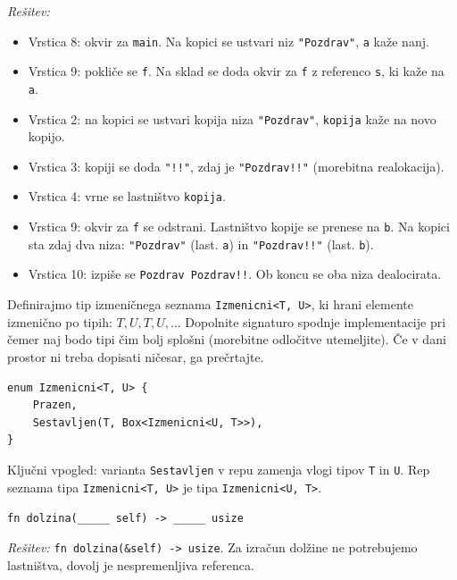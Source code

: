 \documentclass[arhiv]{../izpit}
\begin{document}
\noindent
\emph{Rešitev:}
\begin{itemize}
  \item Vrstica 8: okvir za \texttt{main}. Na kopici se ustvari niz \texttt{"Pozdrav"}, \texttt{a} kaže nanj.
  \item Vrstica 9: pokliče se \texttt{f}. Na sklad se doda okvir za \texttt{f} z referenco \texttt{s}, ki kaže na \texttt{a}.
  \item Vrstica 2: na kopici se ustvari kopija niza \texttt{"Pozdrav"}, \texttt{kopija} kaže na novo kopijo.
  \item Vrstica 3: kopiji se doda \texttt{"!!"}, zdaj je \texttt{"Pozdrav!!"} (morebitna realokacija).
  \item Vrstica 4: vrne se lastništvo \texttt{kopija}.
  \item Vrstica 9: okvir za \texttt{f} se odstrani. Lastništvo kopije se prenese na \texttt{b}. Na kopici sta zdaj dva niza: \texttt{"Pozdrav"} (last. \texttt{a}) in \texttt{"Pozdrav!!"} (last. \texttt{b}).
  \item Vrstica 10: izpiše se \texttt{Pozdrav Pozdrav!!}. Ob koncu se oba niza dealocirata.
\end{itemize}



\naloga[\tocke{20}]

Definirajmo tip izmeničnega seznama \texttt{Izmenicni<T, U>}, ki hrani elemente izmenično po tipih: $T, U, T, U, \ldots$ Dopolnite signaturo spodnje implementacije pri čemer naj bodo tipi čim bolj splošni (morebitne odločitve utemeljite). Če v dani prostor ni treba dopisati ničesar, ga prečrtajte.

{\large
\begin{verbatim}
enum Izmenicni<T, U> {
    Prazen,
    Sestavljen(T, Box<Izmenicni<U, T>>),
}
\end{verbatim}
}

\noindent
Ključni vpogled: varianta \texttt{Sestavljen} v repu zamenja vlogi tipov \texttt{T} in \texttt{U}. Rep seznama tipa \texttt{Izmenicni<T, U>} je tipa \texttt{Izmenicni<U, T>}.

\podnaloga
\texttt{fn dolzina(_____ self) -> _____ usize}

\noindent
\emph{Rešitev:} \texttt{fn dolzina(&self) -> usize}. Za izračun dolžine ne potrebujemo lastništva, dovolj je nespremenljiva referenca.
\end{document}
